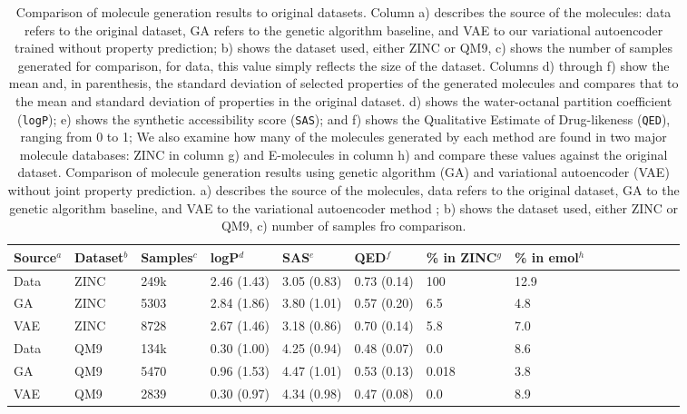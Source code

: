 \documentclass[journal=acscii,manuscript=article]{achemso}
\begin{document}
\begin{table}[h]
\small
\centering
\begin{tabular}{lp{1cm}lp{1.3cm}lp{1cm}lp{1cm}lp{1cm}lp{0.6cm}lp{1cm}l}
\hline
  Source$^{a}$ & Dataset$^{b}$ &  Samples$^{c}$ &   logP$^{d}$ &      SAS$^{e}$  &   QED$^{f}$ & \% in ZINC$^{g}$ & \% in emol$^{h}$ \\
\hline
   Data &    ZINC &     249k &  2.46 (1.43) &  3.05 (0.83)  &  0.73 (0.14) & 100 & 12.9 \\
  GA &    ZINC &     5303 &  2.84 (1.86) &  3.80 (1.01) &  0.57 (0.20) &        6.5 &  4.8\\
    VAE &    ZINC &     8728 &  2.67 (1.46) &  3.18 (0.86) &  0.70 (0.14) &      5.8 & 7.0\\
\hline
Data &     QM9 &     134k &  0.30 (1.00) &  4.25 (0.94) &  0.48 (0.07)  &    0.0 & 8.6 \\
GA &     QM9 &     5470 &  0.96 (1.53) &  4.47 (1.01) &  0.53 (0.13)  &        0.018    & 3.8 \\
 VAE &     QM9 &     2839 &  0.30 (0.97) &  4.34 (0.98) &  0.47 (0.08) &        0.0  &  8.9\\
 \hline
 \end{tabular}
 \caption{
 \replaced
{Comparison of molecule generation results to original datasets. Column a) describes the source of the molecules: data refers to the original dataset, GA refers to the genetic algorithm baseline, and VAE to our variational autoencoder trained without property prediction;  b) shows the dataset used, either ZINC or QM9, c) shows the number of samples generated for comparison, for data, this value simply reflects the size of the dataset. 
Columns d) through f) show the mean and, in parenthesis, the standard deviation of selected properties of the generated molecules and compares that to the mean and standard deviation of properties in the original dataset. 
 d) shows the water-octanal partition coefficient (\texttt{logP})\cite{wildman_1999_prediction}; e) shows the synthetic accessibility score (\texttt{SAS})\cite{Ertl2009estimation}; and f) shows the Qualitative Estimate of Drug-likeness (\texttt{QED})\cite{bickerton2012quantifying}, ranging from 0 to 1; 
We also examine how many of the molecules generated by each method are found in two major molecule databases: ZINC in column g) and E-molecules\cite{emolecules} in column h) and compare these values against the original dataset.}
{Comparison of molecule generation results using genetic algorithm (GA) and variational autoencoder (VAE) without joint property prediction.  a) describes the source of the molecules, data refers to the original dataset, GA to the genetic algorithm baseline, and VAE to the variational autoencoder method ;   b) shows the dataset used, either ZINC or QM9, c) number of samples fro comparison. 
}}
\end{table}
\end{document}
